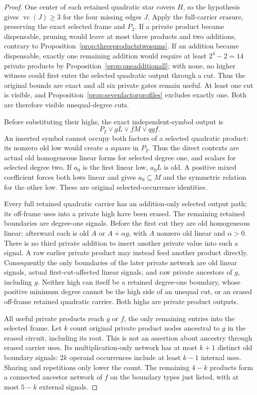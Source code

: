 \documentclass[11pt]{article}
\newcommand{\vc}{\operatorname{vc}}
\theoremstyle{definition}
\theoremstyle{remark}
\begin{document}
\begin{proof}
One center of each retained quadratic star covers $H$, so the hypothesis gives $\vc(J)\ge3$ for the four missing edges $J$. Apply the full-carrier erasure, preserving the exact selected frame and $P_2$. If a private product became dispensable, pruning would leave at most three products and two additions, contrary to Proposition~\ref{prop:threeproductstwosums}. If an addition became dispensable, exactly one remaining addition would require at least $2^4-2=14$ private products by Proposition~\ref{prop:oneadditionall}; with none, no higher witness could first enter the selected quadratic output through a cut. Thus the original bounds are exact and all six private gates remain useful. At least one cut is visible, and Proposition~\ref{prop:sevenfactorprofiles} excludes exactly one. Both are therefore visible unequal-degree cuts.

Before substituting their highs, the exact independent-symbol output is
\[
 P_2\vee gL\vee fM\vee qgf.
\]
An inserted symbol cannot occupy both factors of a selected quadratic product: its nonzero old low would create a square in $P_2$. Thus the direct contexts are actual old homogeneous linear forms for selected degree one, and scalars for selected degree two. If $a_0$ is the first linear low, $a_0L$ is old. A positive mixed coefficient forces both lows linear and gives $a_0\subseteq M$ and the symmetric relation for the other low. These are original selected-occurrence identities.

Every full retained quadratic carrier has an addition-only selected output path; its off-frame uses into a private high have been erased. The remaining retained boundaries are degree-one signals. Before the first cut they are old homogeneous linear; afterward each is old $A$ or $A+\alpha g$, with $A$ nonzero old linear and $\alpha>0$. There is no third private addition to insert another private value into such a signal. A raw earlier private product may instead feed another product directly. Consequently the only boundaries of the later private network are old linear signals, actual first-cut-affected linear signals, and raw private ancestors of $g$, including $g$. Neither high can itself be a retained degree-one boundary, whose positive minimum degree cannot be the high side of an unequal cut, or an erased off-frame retained quadratic carrier. Both highs are private product outputs.

All useful private products reach $g$ or $f$, the only remaining entries into the selected frame. Let $k$ count original private product nodes ancestral to $g$ in the erased circuit, including its root. This is not an assertion about ancestry through erased carrier uses. Its multiplication-only network has at most $k+1$ distinct old boundary signals: $2k$ operand occurrences include at least $k-1$ internal uses. Sharing and repetitions only lower the count. The remaining $4-k$ products form a connected ancestor network of $f$ on the boundary types just listed, with at most $5-k$ external signals.


\end{proof}
\end{document}

